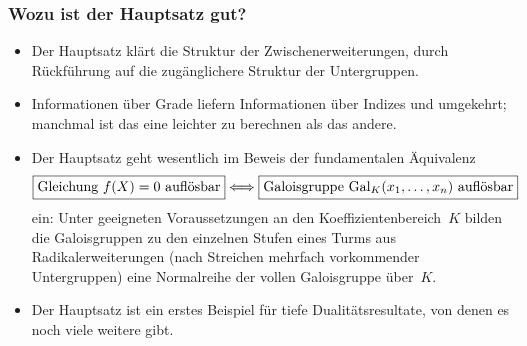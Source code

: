 \documentclass{../../algblatt}
\begin{document}
\subsubsection*{Wozu ist der Hauptsatz gut?}

\begin{itemize}
\item Der Hauptsatz klärt die Struktur der Zwischenerweiterungen, durch
Rückführung auf die zugänglichere Struktur der Untergruppen.
\item Informationen über Grade liefern Informationen über Indizes und
umgekehrt; manchmal ist das eine leichter zu berechnen als das andere.
\item Der Hauptsatz geht wesentlich im Beweis der fundamentalen Äquivalenz
\[ \framebox{Gleichung $f(X) = 0$ auflösbar}
  \Longleftrightarrow
  \framebox{Galoisgruppe~$\Gal_K(x_1,\ldots,x_n)$ auflösbar}
\]
ein: Unter geeigneten Voraussetzungen an den Koeffizientenbereich~$K$ bilden
die Galoisgruppen zu den einzelnen Stufen eines Turms aus Radikalerweiterungen
(nach Streichen mehrfach vorkommender Untergruppen) eine Normalreihe der
vollen Galoisgruppe über~$K$.
\item Der Hauptsatz ist ein erstes Beispiel für tiefe Dualitätsresultate,
von denen es noch viele weitere gibt.
\end{itemize}
\end{document}
